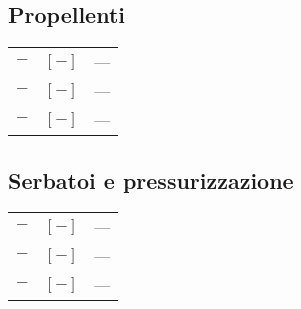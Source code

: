 \begin{multicols}{2}
	\subsection{Propellenti}
	\begin{tabularx}{\linewidth}{ccX}
		$\bm{-}$ & $[-]$ & --- \\
		$\bm{-}$ & $[-]$ & --- \\
		$\bm{-}$ & $[-]$ & ---
	\end{tabularx}

	\subsection{Serbatoi e pressurizzazione}
	\begin{tabularx}{\linewidth}{ccX}
		$\bm{-}$ & $[-]$ & --- \\
		$\bm{-}$ & $[-]$ & --- \\
		$\bm{-}$ & $[-]$ & ---
	\end{tabularx}


\end{multicols}
